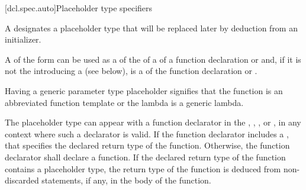[dcl.spec.auto]{Placeholder type specifiers}%
%

\begin{bnf}
\br
   \br
    \terminal{(}  \terminal{)}
\end{bnf}

\pnum
A 
designates a placeholder type that will be replaced later by deduction
from an initializer.

\pnum
A  of the form
 
can be used as a  of
the  of
a  of
a function declaration or  and,
if it is not the  
introducing a  (see below),
is a 
of the function declaration or .
\begin{note}
Having a generic parameter type placeholder
signifies that the function is
an abbreviated function template or
the lambda is a generic lambda.
\end{note}

\pnum
The placeholder type can appear with a function declarator in the
, ,
, or ,
in any context where such a declarator is valid. If the function declarator
includes a , that
 specifies
the declared return type of the function. Otherwise, the function declarator
shall declare a function. If the declared return type of the
function contains a placeholder type, the return type of the function is
deduced from non-discarded  statements, if any, in the body
of the function.

